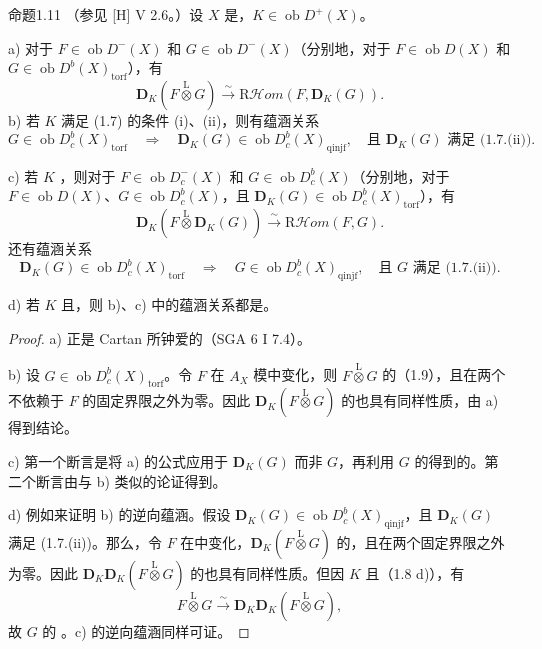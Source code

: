 \begin{SGAresult}{命题}{1.11}
（参见 [H] V 2.6。）设 $X$ 是，$K\in\operatorname{ob}D^+(X)$。

a) 对于 $F\in\operatorname{ob}D^-(X)$ 和 $G\in\operatorname{ob}D^-(X)$（分别地，对于 $F\in\operatorname{ob}D(X)$ 和 $G\in\operatorname{ob}D^b(X)_{\mathrm{torf}}$），有
\[
 \mathbf D_K(F\mathbin{\overset{\mathrm L}{\otimes}}G)\xrightarrow{\sim}
 \mathrm R\mathcal Hom(F,\mathbf D_K(G)).
\]
b) 若 $K$ 满足 (1.7) 的条件 (i)、(ii)，则有蕴涵关系
\[
 G\in\operatorname{ob}D_c^b(X)_{\mathrm{torf}}\quad\Longrightarrow\quad
 \mathbf D_K(G)\in\operatorname{ob}D_c^b(X)_{\mathrm{qinjf}},
 \quad\text{且 }\mathbf D_K(G)\text{ 满足 (1.7.(ii))}.
\]

c) 若 $K$ ，则对于 $F\in\operatorname{ob}D_c^-(X)$ 和 $G\in\operatorname{ob}D_c^b(X)$（分别地，对于 $F\in\operatorname{ob}D(X)$、$G\in\operatorname{ob}D_c^b(X)$，且 $\mathbf D_K(G)\in\operatorname{ob}D_c^b(X)_{\mathrm{torf}}$），有
\[
 \mathbf D_K(F\mathbin{\overset{\mathrm L}{\otimes}}\mathbf D_K(G))\xrightarrow{\sim}\mathrm R\mathcal Hom(F,G).
\]
还有蕴涵关系
\[
 \mathbf D_K(G)\in\operatorname{ob}D_c^b(X)_{\mathrm{torf}}\quad\Longrightarrow\quad
 G\in\operatorname{ob}D_c^b(X)_{\mathrm{qinjf}},\quad\text{且 }G\text{ 满足 (1.7.(ii))}.
\]

d) 若 $K$ 且，则 b)、c) 中的蕴涵关系都是。
\end{SGAresult}
\begin{proof}
a) 正是 Cartan 所钟爱的（SGA 6 I 7.4）。

b) 设 $G\in\operatorname{ob}D_c^b(X)_{\mathrm{torf}}$。令 $F$ 在 $A_X$ 模中变化，则 $F\mathbin{\overset{\mathrm L}{\otimes}}G$ 的（1.9），且在两个不依赖于 $F$ 的固定界限之外为零。因此 $\mathbf D_K(F\mathbin{\overset{\mathrm L}{\otimes}}G)$ 的也具有同样性质，由 a) 得到结论。

c) 第一个断言是将 a) 的公式应用于 $\mathbf D_K(G)$ 而非 $G$，再利用 $G$ 的得到的。第二个断言由与 b) 类似的论证得到。

d) 例如来证明 b) 的逆向蕴涵。假设 $\mathbf D_K(G)\in\operatorname{ob}D_c^b(X)_{\mathrm{qinjf}}$，且 $\mathbf D_K(G)$ 满足 (1.7.(ii))。那么，令 $F$ 在中变化，$\mathbf D_K(F\mathbin{\overset{\mathrm L}{\otimes}}G)$ 的，且在两个固定界限之外为零。因此 $\mathbf D_K\mathbf D_K(F\mathbin{\overset{\mathrm L}{\otimes}}G)$ 的也具有同样性质。但因 $K$ 且（1.8 d)），有
\[
 F\mathbin{\overset{\mathrm L}{\otimes}}G\xrightarrow{\sim}\mathbf D_K\mathbf D_K(F\mathbin{\overset{\mathrm L}{\otimes}}G),
\]
故 $G$ 的 。c) 的逆向蕴涵同样可证。
\end{proof}

